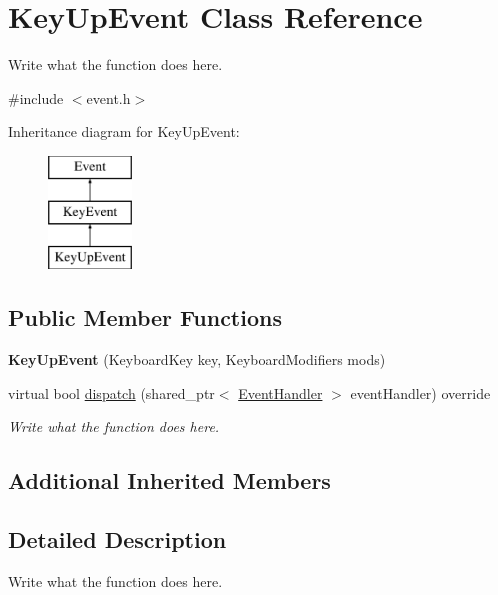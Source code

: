 \hypertarget{classKeyUpEvent}{\section{Key\+Up\+Event Class Reference}
\label{classKeyUpEvent}
}


Write what the function does here.  




{\ttfamily \#include $<$event.\+h$>$}

Inheritance diagram for Key\+Up\+Event\+:\begin{figure}[H]
\begin{center}
\leavevmode
\includegraphics[height=3.000000cm]{classKeyUpEvent}
\end{center}
\end{figure}
\subsection*{Public Member Functions}
\begin{DoxyCompactItemize}
\item 
\hypertarget{classKeyUpEvent_a26f3177d7dc9887e87fbea4f5dded283}{{\bfseries Key\+Up\+Event} (Keyboard\+Key key, Keyboard\+Modifiers mods)}\label{classKeyUpEvent_a26f3177d7dc9887e87fbea4f5dded283}

\item 
virtual bool \hyperlink{classKeyUpEvent_a24d061fc9e6559908c91972376d4a3d4}{dispatch} (shared\+\_\+ptr$<$ \hyperlink{structEventHandler}{Event\+Handler} $>$ event\+Handler) override
\begin{DoxyCompactList}\small\item\em Write what the function does here. \end{DoxyCompactList}\end{DoxyCompactItemize}
\subsection*{Additional Inherited Members}


\subsection{Detailed Description}
Write what the function does here. 


